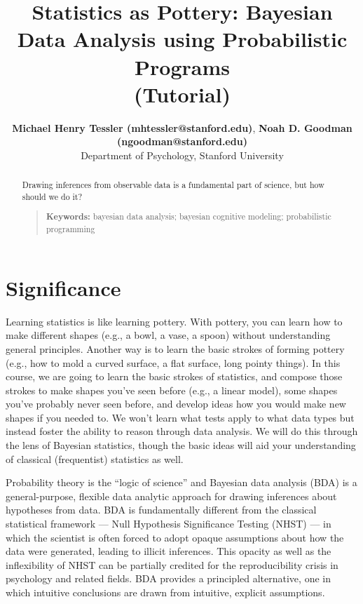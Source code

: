 \documentclass[10pt,letterpaper]{article}
\title{Statistics as Pottery: Bayesian Data Analysis using Probabilistic Programs \\(Tutorial)}
\author{{\large \bf Michael Henry Tessler (mhtessler@stanford.edu)}, {\large \bf Noah D. Goodman (ngoodman@stanford.edu)}  \\
  Department of Psychology, Stanford University
  }
\begin{document}
\maketitle

\begin{abstract}

Drawing inferences from observable data is a fundamental part of science, but how should we do it?
\begin{quote}
\small
\textbf{Keywords:} 
bayesian data analysis; bayesian cognitive modeling; probabilistic programming
\end{quote}

\end{abstract}





\section{Significance}

Learning statistics is like learning pottery. 
With pottery, you can learn how to make different shapes (e.g., a bowl, a vase, a spoon) without understanding general principles. 
Another way is to learn the basic strokes of forming pottery (e.g., how to mold a curved surface, a flat surface, long pointy things). 
In this course, we are going to learn the basic strokes of statistics, and compose those strokes to make shapes you've seen before (e.g., a linear model), some shapes you've probably never seen before, and develop ideas how you would make new shapes if you needed to. 
We won't learn what tests apply to what data types but instead foster the ability to reason through data analysis. 
We will do this through the lens of Bayesian statistics, though the basic ideas will aid your understanding of classical (frequentist) statistics as well.


Probability theory is the ``logic of science'' \cite{jaynes2003probability} and Bayesian data analysis (BDA) is a general-purpose, flexible data analytic approach for drawing inferences about hypotheses from data.
BDA is fundamentally different from the classical statistical framework --- Null Hypothesis Significance Testing (NHST) --- in which the scientist is often forced to adopt opaque assumptions about how the data were generated, leading to illicit inferences.
This opacity as well as the inflexibility of NHST can be partially credited for the reproducibility crisis in psychology and related fields. 
BDA provides a principled alternative, one in which intuitive conclusions are drawn from intuitive, explicit assumptions.
\end{document}
